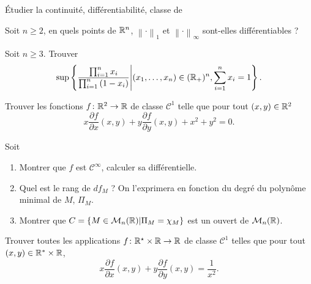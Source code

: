 \documentclass[12pt]{article}
\begin{document}
\begin{exercise}
	Étudier la continuité, différentiabilité, classe de 
\end{exercise}

\begin{exercise}
	Soit $n\geqslant 2$, en quels points de $\mathbb{R}^{n}$, $\left\lVert\cdot\right\rVert_{1}$ et $\left\lVert\cdot\right\rVert_{\infty}$ sont-elles différentiables ?
\end{exercise}

\begin{exercise}
	Soit $n\geqslant3$. Trouver 
	\begin{equation}
		\sup\left\lbrace\frac{\prod_{i=1}^{n}x_i}{\prod_{i=1}^{n}\left(1-x_i\right)}\middle| (x_1,\dots,x_n)\in(\mathbb{R}_{+})^{n},\sum_{i=1}^{n}x_i=1\right\rbrace.
	\end{equation}
\end{exercise}

\begin{exercise}
	Trouver les fonctions $f\colon\mathbb{R}^{2}\to\mathbb{R}$ de classe $\mathcal{C}^{1}$ telle que pour tout $(x,y)\in\mathbb{R}^{2}$
	\begin{equation}
		x\frac{\partial f}{\partial x}(x,y)+y\frac{\partial f}{\partial y}(x,y)+x^{2}+y^{2}=0.
	\end{equation}
\end{exercise}

\begin{exercise}
	Soit 
	\begin{enumerate}
		\item Montrer que $f$ est $\mathcal{C}^{\infty}$, calculer sa différentielle.
		\item Quel est le rang de $df_{M}$ ? On l'exprimera en fonction du degré du polynôme minimal de $M$, $\Pi_{M}$.
		\item Montrer que $C=\left\lbrace M\in\mathcal{M}_n(\mathbb{R})\middle|\Pi_{M}=\chi_{M}\right\rbrace$ est un ouvert de $\mathcal{M}_n(\mathbb{R})$.
	\end{enumerate}
\end{exercise}

\begin{exercise}
	Trouver toutes les applications $f\colon\mathbb{R}^{\star}\times\mathbb{R}\to\mathbb{R}$ de classe $\mathcal{C}^{1}$ telles que pour tout $(x,y)\in\mathbb{R}^{*}\times\mathbb{R}$, 
	\begin{equation}
		x\frac{\partial f}{\partial x}(x,y)+y\frac{\partial f}{\partial y}(x,y)=\frac{1}{x^{2}}.
	\end{equation}
\end{exercise}
\end{document}
